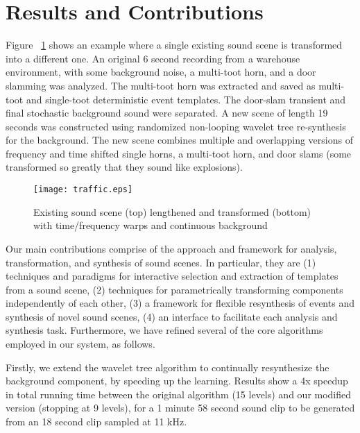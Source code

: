 \documentclass[a4paper]{article}
\begin{document}
\section{Results and Contributions}

Figure ~\ref{fig:traffic} shows an example where a single 
existing sound scene is transformed into a different one. 
An original 6 second recording from a warehouse
environment, with some background noise, a multi-toot horn,
and a door slamming was analyzed. The multi-toot horn
was extracted and saved as multi-toot and single-toot deterministic event 
templates. The door-slam transient and final stochastic background sound were separated. 
A new scene of length 19 seconds was constructed using randomized non-looping wavelet
tree re-synthesis for the background. The
new scene combines multiple and overlapping versions
of frequency and time shifted single horns,
a multi-toot horn, and door slams (some transformed
so greatly that they sound like explosions). 

\begin{figure}[t]
\centering
\texttt{[image: traffic.eps]}
\caption{Existing sound scene (top) lengthened and transformed (bottom) with time/frequency 
warps and continuous background}
\label{fig:traffic}
\end{figure}
Our main contributions comprise of the approach and framework for analysis, transformation, 
and synthesis of sound scenes.  In particular, they are (1) techniques and paradigms for 
interactive selection and extraction of templates from a sound scene, (2) techniques for 
parametrically transforming components independently of each other, (3) a 
framework for flexible resynthesis of events and synthesis of novel sound scenes, (4) an 
interface to facilitate each analysis and synthesis task.  Furthermore, we 
have refined several of the core algorithms employed in our system, as follows.

Firstly, we extend the wavelet tree algorithm to 
continually resynthesize the background component, by speeding up the learning. Results show a 4x speedup 
in total running time between the original algorithm (15 levels) and our modified version (stopping 
at 9 levels), for a 1 minute 58 second sound clip to be generated from an 18 second clip sampled at 
11 kHz.

\end{document}
